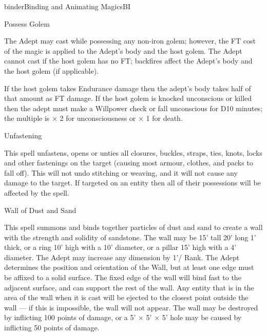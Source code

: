 \begin{College}[1.2]{binder}{Binding and Animating Magics}{BI}
\begin{spell}[S-10]{Possess Golem}
\begin{effects}
The Adept may cast while possessing any non-iron golem; however, the
FT cost of the magic is applied to the Adept’s body and the host
golem. The Adept cannot cast if the host golem has no FT; backfires
affect the Adept’s body and the host golem (if applicable).

If the host golem takes Endurance damage then the adept’s body takes
half of that amount as FT damage.  If the host golem is knocked
unconscious or killed then the adept must make a Willpower check or
fall unconscious for D10 minutes; the multiple is × 2 for
unconsciousness or × 1 for death.
\end{effects}
\end{spell}

\begin{spell}[S-11]{Unfastening}
\begin{effects}
This spell unfastens, opens or unties all closures, buckles, straps,
ties, knots, locks and other fastenings on the target (causing most
armour, clothes, and packs to fall off). This will not undo stitching
or weaving, and it will not cause any damage to the target.  If
targeted on an entity then all of their possessions will be affected
by the spell.
\end{effects}
\end{spell}

\begin{spell}[S-12]{Wall of Dust and Sand}
\begin{effects}
This spell summons and binds together particles of dust and sand to
create a wall with the strength and solidity of sandstone. The wall
may be 15’ tall 20’ long 1’ thick, or a ring 10’ high with a 10’
diameter, or a pillar 15’ high with a 4’ diameter.  The Adept may
increase any dimension by 1’/ Rank.  The Adept determines the position
and orientation of the Wall, but at least one edge must be affixed to
a solid surface.  The fixed edge of the wall will bind fast to the
adjacent surface, and can support the rest of the wall. Any entity
that is in the area of the wall when it is cast will be ejected to the
closest point outside the wall --- if this is impossible, the wall
will not appear. The wall may be destroyed by inflicting 100 points of
damage, or a 5’ × 5’ × 5’ hole may be caused by inflicting 50 points
of damage.
\end{effects}
\end{spell}


\end{College}

